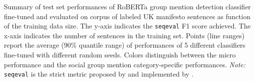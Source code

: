 Summary of test set performances of RoBERTa group mention detection classifier fine-tuned and evaluated on corpus of labeled UK manifesto sentences as function of the training data size. The y-axis indicates the \texttt{seqeval} F1 score achieved. The x-axis indicates the number of sentences in the training set. Points (line ranges) report the average (90\% quantile range) of performances of 5 different classifiers fine-tuned with different random seeds. Colors distinguish between the micro performance and the social group mention category-specific performances. \emph{Note:} \texttt{seqeval} is the strict metric proposed by \citet{ramshaw_text_1995} and implemented by \citet{nakayama_seqeval_2018}. \label{fig:uk-manifestos_training-size_roberta-finetuning_testset_seqeval_f1}
